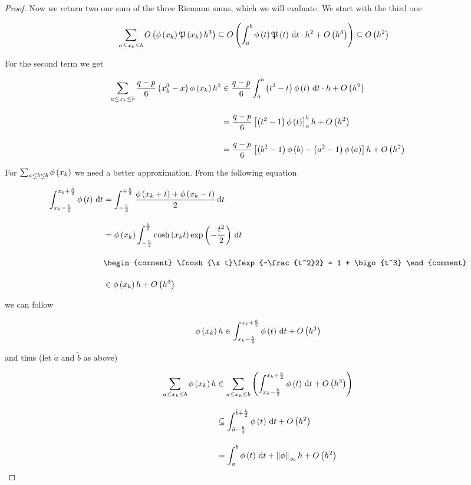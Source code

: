\begin{proof}

  Now we return two our sum of the three Riemann sums, which we will evaluate. We start with the third one

  \begin{align}
    \sum_{a \le x_{k} \le b} O\left( {\phi\left( {x_{k}} \right) \mathfrak P\left( {x_{k}} \right) h^3} \right) & \subseteq O\left( {\int_a^b \phi\left( {t} \right) \mathfrak P\left( {t} \right) \,\mathrm d{t} \cdot h^2 + O\left( {h^3} \right)} \right) \subseteq O\left( {h^2} \right)
  \end{align}

  \noindent For the second term we get

  \begin{align}
    \sum_{a \le \x \le b} \frac{q-p}6 \br{\x^3 - x} \fphi{\x} h^2 &\in \frac{q-p}6 \int_a^b \br{t^3-t}\fphi{t} \d{t} \cdot h + \bigo{h^2} \bnl
    &= \frac{q-p}6 \left[ \br{t^2-1}\fphi{t} \right]_a^b h + \bigo{h^2} \bnl
    &= \frac{q-p}6 \left[ \br{b^2-1}\fphi{b} - \br{a^2-1}\fphi{a} \right] h + \bigo{h^2}
  \end{align}

  For $\sum_{a\le b\le b} \phi\left( {x_{k}} \right)$ we need a better approximation. From the following equation

  \begin{align}
    \int_{\x-\frac h2}^{\x+\frac h2} \fphi{t} \d{t} & = \int_{-\frac h2}^{+\frac h2} \frac{\fphi{\x+t}+\fphi{\x-t}}2 \d{t} \bnl
    & = \fphi{\x} \int_{-\frac h2}^{\frac h2} \fcosh{\x t} \fexp{-\frac{t^2}2} \d{t} \bnl
    &
    \begin{comment}
      \fcosh{\x t}\fexp{-\frac{t^2}2} = 1 + \bigo{t^3}
    \end{comment} \bnl
    & \in \fphi{\x} h + \bigo{h^3}
  \end{align}

  \noindent we can follow

  \begin{align}
    \phi\left( {x_{k}} \right) h \in \int_{x_{k}-\frac h2}^{x_{k}+\frac h2} \phi\left( {t} \right) \,\mathrm d{t} + O\left( {h^3} \right)
  \end{align}

  \noindent and thus (let $\tilde a$ and $\tilde b$ as above)

  \begin{align}
    \sum_{a \le \x \le b} \fphi{\x} h &\in \sum_{a \le \x \le b} \br{\int_{\x-\frac h2}^{\x+\frac h2} \fphi{t} \d{t} + \bigo{h^3}} \bnl
    &\subseteq \int_{\tilde a - \frac h2}^{\tilde b+\frac h2} \fphi{t} \d{t} + \bigo{h^2} \bnl
    &= \int_a^b \fphi{t} \d{t} + \snorm{\phi} h + \bigo{h^2}
  \end{align}


\end{proof}

